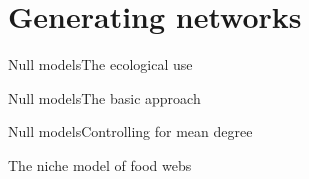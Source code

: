 \documentclass[serif,mathserif,usenames,professionalfonts,11pt,aspectratio=149]{beamer}
\begin{document}
\section{Generating networks}

\begin{frame}{Null models}{The ecological use}
   
\end{frame}

\begin{frame}{Null models}{The basic approach}
\end{frame}

\begin{frame}{Null models}{Controlling for mean degree}
\end{frame}

\begin{frame}{The niche model of food webs}

\end{frame}
\end{document}

